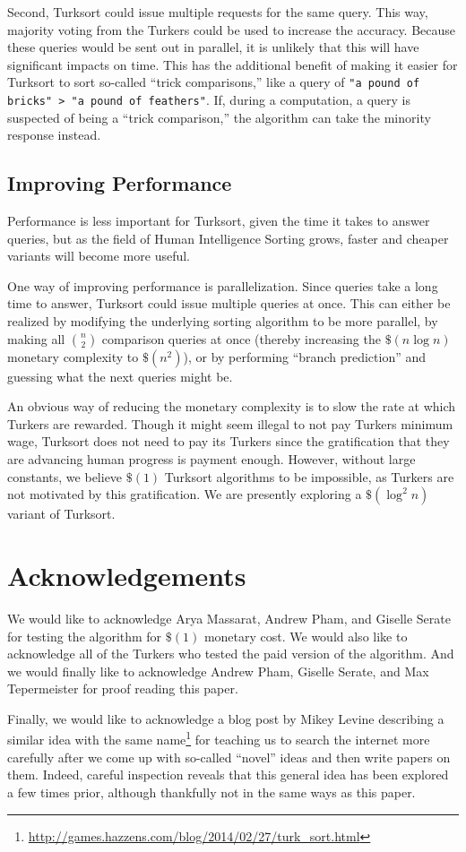 \documentclass{article}
\begin{document}
Second, Turksort could issue multiple requests for the same query. This way,
majority voting from the Turkers could be used to increase the accuracy. Because
these queries would be sent out in parallel, it is unlikely that this will have
significant impacts on time. This has the additional benefit of making it easier
for Turksort to sort so-called ``trick comparisons,'' like a query of \texttt{"a
  pound of bricks" > "a pound of feathers"}. If, during a computation, a query
is suspected of being a ``trick comparison,'' the algorithm can take the
minority response instead.

\subsection{Improving Performance}\label{sec:improving-performance}

Performance is less important for Turksort, given the time it takes to answer
queries, but as the field of Human Intelligence Sorting grows, faster and
cheaper variants will become more useful. 

One way of improving performance is parallelization. Since queries take a long
time to answer, Turksort could issue multiple queries at once. This can either
be realized by modifying the underlying sorting algorithm to be more parallel,
by making all \({n \choose 2}\) comparison queries at once (thereby increasing
the \(\$(n \log n)\) monetary complexity to \(\$(n^2)\)), or by performing
``branch prediction'' and guessing what the next queries might be.

An obvious way of reducing the monetary complexity is to slow the rate at which
Turkers are rewarded. Though it might seem illegal to not pay Turkers minimum
wage, Turksort does not need to pay its Turkers since the gratification that
they are advancing human progress is payment enough. However, without
large constants, we believe \(\$(1)\) Turksort algorithms to be impossible,
as Turkers are not motivated by this gratification. We are presently exploring
a \(\$(\log^2 n)\) variant of Turksort.

\section{Acknowledgements}
We would like to acknowledge Arya Massarat, Andrew Pham, and Giselle Serate for
testing the algorithm for \(\$(1)\) monetary cost. We would also like to
acknowledge all of the Turkers who tested the paid version of the algorithm. And
we would finally like to acknowledge Andrew Pham, Giselle Serate, and Max
Tepermeister for proof reading this paper.

Finally, we would like to acknowledge a blog post by Mikey Levine describing a
similar idea with the same
name\footnote{\url{http://games.hazzens.com/blog/2014/02/27/turk_sort.html}} for
teaching us to search the internet more carefully after we come up with
so-called ``novel'' ideas and then write papers on them. Indeed, careful
inspection reveals that this general idea has been explored a few times prior,
although thankfully not in the same ways as this paper.
\end{document}
